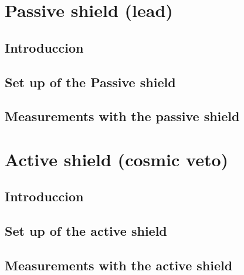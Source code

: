 \documentclass[12pt,a4paper]{book}
\begin{document}
	\section{Passive shield (lead)}
		
		\subsection{Introduccion}
		
		\subsection[Set up of the shield]{Set up of the Passive shield}
		
		\subsection[Measurements of the shield]{Measurements with the passive shield}
		\newpage	
	
	\section{Active shield (cosmic veto)}
	
		\subsection{Introduccion}
		
		\subsection[Set up of the shield]{Set up of the active shield}
		
		\subsection[Measurements of the veto]{Measurements with the active shield}
		\newpage
	
\end{document}
